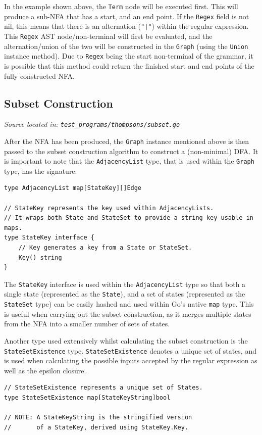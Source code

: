 \documentclass[]{full}
\theoremstyle{definition}
\begin{document}
In the example shown above, the \verb|Term| node will be executed first. This will produce a sub-NFA that has a start, and an end point. If the \verb|Regex| field is not nil, this means that there is an alternation (\verb+"|"+) within the regular expression. This \verb|Regex| AST node/non-terminal will first be evaluated, and the alternation/union of the two will be constructed in the \verb|Graph| (using the \verb|Union| instance method). Due to \verb|Regex| being the start non-terminal of the grammar, it is possible that this method could return the finished start and end points of the fully constructed NFA.

\subsection{Subset Construction}
\cprotect\textit{Source located in: \verb|test_programs/thompsons/subset.go|}

After the NFA has been produced, the \verb|Graph| instance mentioned above is then passed to the subset construction algorithm to construct a (non-minimal) DFA. It is important to note that the \verb|AdjacencyList| type, that is used within the \verb|Graph| type, has the signature:

\begin{verbatim}
type AdjacencyList map[StateKey][]Edge

// StateKey represents the key used within AdjacencyLists.
// It wraps both State and StateSet to provide a string key usable in maps.
type StateKey interface {
	// Key generates a key from a State or StateSet.
	Key() string
}
\end{verbatim}

The \verb|StateKey| interface is used within the \verb|AdjacencyList| type so that both a single state (represented as the \verb|State|), and a set of states (represented as the \verb|StateSet| type) can be easily hashed and used within Go's native \verb|map| type. This is useful when carrying out the subset construction, as it merges multiple states from the NFA into a smaller number of sets of states.

Another type used extensively whilst calculating the subset construction is the \verb|StateSetExistence| type. \verb|StateSetExistence| denotes a unique set of states, and is used when calculating the possible inputs accepted by the regular expression as well as the epsilon closure.

\begin{verbatim}
// StateSetExistence represents a unique set of States.
type StateSetExistence map[StateKeyString]bool

// NOTE: A StateKeyString is the stringified version 
//       of a StateKey, derived using StateKey.Key.
\end{verbatim}
\end{document}
